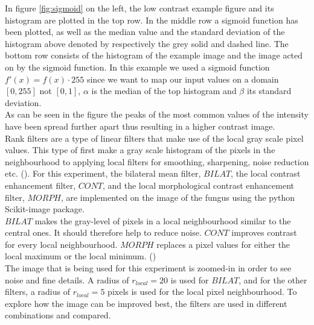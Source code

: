 In figure \ref{fig:sigmoid} on the left, the low contrast example figure and its histogram are plotted in the top row. In the middle row a sigmoid function has been plotted, as well as the median value and the standard deviation of the histogram above denoted by respectively the grey solid and dashed line. The bottom row consists of the histogram of the example image and the image acted on by the sigmoid function. In this example we used a sigmoid function $f'(x)=f(x) \cdot 255$ since we want to map our input values on a domain $[0,255]$ not $[0,1]$, $\alpha$ is the median of the top histogram and $\beta$ its standard deviation.\\
As can be seen in the figure the peaks of the most common values of the intensity have been spread further apart thus resulting in a higher contrast image.\\



Rank filters are a type of linear filters that make use of the local gray scale pixel values. This type of first make a gray scale histogram of the pixels in the neighbourhood to applying local filters for smoothing, sharpening, noise reduction etc. (\cite{rank}).
For this experiment, the bilateral mean filter, $BILAT$, the local contrast enhancement filter, $CONT$, and the local morphological contrast enhancement filter, $MORPH$, are implemented on the image of the fungus using the python Scikit-image package.\\
$BILAT$ makes the gray-level of pixels in a local neighbourhood similar to the central ones. It should therefore help to reduce noise. $CONT$ improves contrast for every local neighbourhood. $MORPH$ replaces a pixel values for either the local maximum or the local minimum. (\cite{rank}) \\
The image that is being used for this experiment is zoomed-in in order to see noise and fine details. A radius of $r_{local} = 20$ is used for $BILAT$, and for the other filters, a radius of $r_{local} = 5$ pixels is used for the local pixel neighbourhood. To explore how the image can be improved best, the filters are used in different combinations and compared.
\clearpage

